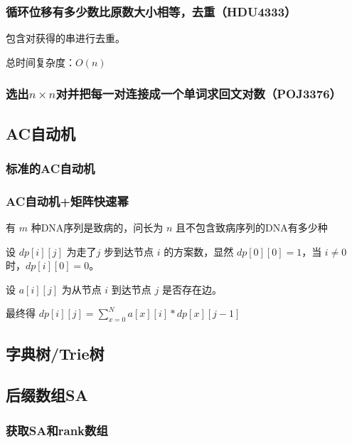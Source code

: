 \documentclass[landscape,twocolumn,twoside,a4paper]{article}
\begin{document}
\subsubsection{循环位移有多少数比原数大小相等，去重（HDU4333）}
包含对获得的串进行去重。\par
总时间复杂度：$O(n)$


\subsubsection{选出$n × n$对并把每一对连接成一个单词求回文对数（POJ3376）}



\subsection{AC自动机}

\subsubsection{标准的AC自动机}


\subsubsection{AC自动机+矩阵快速幂}
有 $m$ 种DNA序列是致病的，问长为 $n$ 且不包含致病序列的DNA有多少种\par
设 $dp[i][j]$ 为走了$j$ 步到达节点 $i$ 的方案数，显然 $dp[0][0]=1$，当 $i \neq 0$ 时，$dp[i][0]=0$。\par
设 $a[i][j]$ 为从节点 $i$ 到达节点 $j$ 是否存在边。\par
最终得 $dp[i][j] = \sum_{x=0}^{N} a[x][i] * dp[x][j-1]$\par



\subsection{字典树/Trie树}


\subsection{后缀数组SA}

\subsubsection{获取SA和rank数组}

\end{document}
